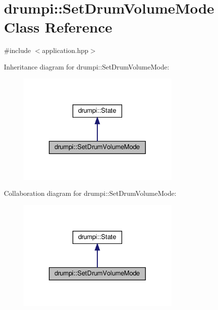 \hypertarget{classdrumpi_1_1SetDrumVolumeMode}{}\section{drumpi\+:\+:Set\+Drum\+Volume\+Mode Class Reference}
\label{classdrumpi_1_1SetDrumVolumeMode}


{\ttfamily \#include $<$application.\+hpp$>$}



Inheritance diagram for drumpi\+:\+:Set\+Drum\+Volume\+Mode\+:
\nopagebreak
\begin{figure}[H]
\begin{center}
\leavevmode
\includegraphics[width=228pt]{classdrumpi_1_1SetDrumVolumeMode__inherit__graph}
\end{center}
\end{figure}


Collaboration diagram for drumpi\+:\+:Set\+Drum\+Volume\+Mode\+:
\nopagebreak
\begin{figure}[H]
\begin{center}
\leavevmode
\includegraphics[width=228pt]{classdrumpi_1_1SetDrumVolumeMode__coll__graph}
\end{center}
\end{figure}
